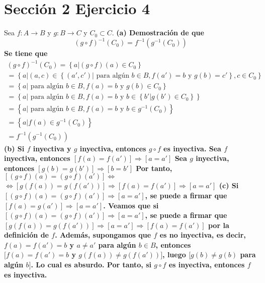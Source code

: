 \documentclass{article}
\begin{document}

\section{Sección 2 Ejercicio 4}
Sea \(f:A \longrightarrow B\) y \(g:B \longrightarrow C\) y \(C_0 \subset C\).
\newline
\bf (a) \rm 
\newline Demostración de que
\begin{equation}
\left( g \circ f\right)^{-1} \left(C_0\right) = f^{-1}\left(g^{-1} \left(C_0 \right) \right)
\end{equation}
Se tiene que
\begin{equation}
\begin{aligned}
\left( g \circ f \right)^{-1} \left( C_0 \right) = \left\{ a | \left(g \circ f \right)\left( a\right) \in C_0 \right\}
\\
= \left\{ a | \left(a,c\right) \in \left\{\left(a',c' \right)|\text{ para algún } b \in B, f\left( a'\right)= b \text{ y }  g \left( b \right)=c' \right\}, c \in C_0 \right\}
\\
= \left\{ a | \text{ para algún } b \in B, f\left( a\right)= b \text{ y }  g \left( b \right) \in C_0 \right\}
\\
= \left\{ a | \text{ para algún } b \in B, f\left( a\right)= b \text{ y }  b \in \left\{b'| g \left( b' \right) \in C_0 \right\} \right\}
\\
= \left\{ a | \text{ para algún } b \in B, f\left( a\right)= b \text{ y }  b \in g^{-1}\left( C_0\right) \right\}
\\
= \left\{ a | f \left(a\right) \in g^{-1}\left( C_0\right) \right\}
\\
=f^{-1} \left( g^{-1}\left( C_0\right) \right)
\end{aligned}
\end{equation}
\bf (b) \rm Si \(f\) inyectiva y \(g\) inyectiva, entonces \( g\circ f \) es inyectiva. 
\newline
Sea \(f\) inyectiva, entonces \( [ f(a)=f(a')]\Rightarrow [a=a']\)
\newline
Sea \(g\) inyectiva, entonces \( [ g(b)=g(b')]\Rightarrow [b=b']\)
\newline
Por tanto, \([(g \circ f)(a) = (g \circ f)(a')] \Leftrightarrow \)
\newline
\(\Leftrightarrow [g ( f(a)) = g ( f(a'))] \Rightarrow   [ f(a) = f(a')] \Rightarrow [a=a'] \)
\newline
\bf (c) \rm Si \([(g \circ f)(a) = (g \circ f)(a')] \Rightarrow [a=a'] \), se puede a firmar que \([f(a) = g (a')] \Rightarrow [a=a'] \). Veamos que si \([(g \circ f)(a) = (g \circ f)(a')] \Rightarrow [a=a'] \), se puede a firmar que \([g(f(a))=g(f(a'))] \Rightarrow [a=a'] \Rightarrow [f(a)=f(a')]\) por la definición de \(f\). Además, supongamos que \(f\) es no inyectiva, es decir, \(f(a)=f(a')=b \) y \(a \neq a' \) para algún \(b \in B\), entonces \([f(a)=f(a')=b\) y \(g(f(a)) \neq g(f(a'))] \), luego \( [ g(b) \neq g(b)\) para algún \(b]\). Lo cual es absurdo. Por tanto, si \(g \circ f\) es inyectiva, entonces \(f\) es inyectiva.
\end{document}
